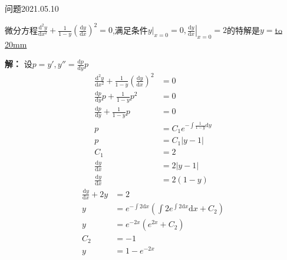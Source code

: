 \begin{mybox}{问题2021.05.10}
	
	\qquad 微分方程$\frac{\mathrm{d}^2 y}{\mathrm{d}x^2}+\frac{1}{1-y}(\frac{\mathrm{d}y}{\mathrm{d}x})^2=0$,满足条件$\left.y \right|_{x=0}=0,\left.\frac{\mathrm{d}y}{\mathrm{d}x}\right|_{x=0}=2 $的特解是$y=$\underline{\hbox to 20mm{}}
\end{mybox}
\noindent
\textbf{解：}
设$p=y',y''=\frac{\mathrm{d}p}{\mathrm{d}y}p$
\begin{align*}
	\frac{\mathrm{d}^2 y}{\mathrm{d}x^2}+\frac{1}{1-y}(\frac{\mathrm{d}y}{\mathrm{d}x})^2&=0\\
	\frac{\mathrm{d}p}{\mathrm{d}y}p+\frac{1}{1-y}p^2&=0\\
	\frac{\mathrm{d}p}{\mathrm{d}y}+\frac{1}{1-y}p&=0\\
	p&=C_{1}e^{-\int \frac{1}{1-y}\mathrm{d}y}\\
	p&=C_{1}\left|y-1\right|\\
	C_{1}&=2\\
	\frac{\mathrm{d}y}{\mathrm{d}x}&=2\left|y-1\right|\\
	\frac{\mathrm{d}y}{\mathrm{d}x}&=2(1-y)
\end{align*}
\begin{align*}
	\frac{\mathrm{d}y}{\mathrm{d}x}+2y&=2\\
	y&=e^{-\int 2\mathrm{d}x}(\int 2e^{\int 2\mathrm{d}x} \mathrm{d}x +C_{2})\\
	y&=e^{-2x}(e^{2x}+C_{2})\\
	C_{2}&=-1\\
	y&=1-e^{-2x}
\end{align*}